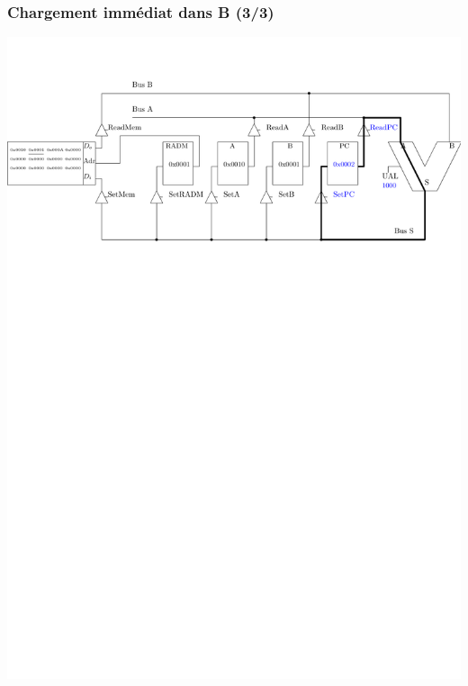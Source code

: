 \documentclass{beamer}
\begin{document}
\begin{frame}
\frametitle{Chargement immédiat dans B (3/3)}
\centering\includegraphics[width=\linewidth]{Figs/premier_chemin_ldb_3.pdf}
\end{frame}
\end{document}
